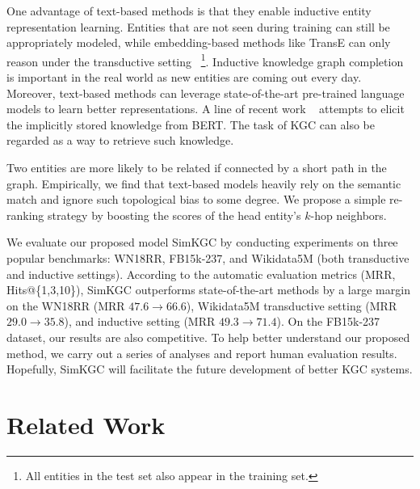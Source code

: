 \documentclass[11pt]{article}
\begin{document}
One advantage of text-based methods is that
they enable inductive entity representation learning.
Entities that are not seen during training can still be appropriately modeled,
while embedding-based methods like TransE can only reason under the transductive setting
~\footnote{All entities in the test set also appear in the training set.}.
Inductive knowledge graph completion is important in the real world
as new entities are coming out every day.
Moreover,
text-based methods can leverage state-of-the-art pre-trained language models to learn better representations.
A line of recent work ~\citep{shin-etal-2020-autoprompt,petroni-etal-2019-language}
attempts to elicit the implicitly stored knowledge from BERT.
The task of KGC can also be regarded as a way to retrieve such knowledge.

Two entities are more likely to be related
if connected by a short path in the graph.
Empirically,
we find that text-based models heavily rely on the semantic match
and ignore such topological bias to some degree.
We propose a simple re-ranking strategy
by boosting the scores of the head entity's $k$-hop neighbors.

We evaluate our proposed model SimKGC
by conducting experiments on three popular benchmarks:
WN18RR, FB15k-237, and Wikidata5M (both transductive and inductive settings).
According to the automatic evaluation metrics (MRR, Hits@\{1,3,10\}),
SimKGC outperforms state-of-the-art methods by a large margin
on the WN18RR (MRR $47.6 \rightarrow 66.6$),
Wikidata5M transductive setting (MRR $29.0 \rightarrow 35.8$),
and inductive setting (MRR $49.3 \rightarrow 71.4$).
On the FB15k-237 dataset,
our results are also competitive.
To help better understand our proposed method,
we carry out a series of analyses
and report human evaluation results.
Hopefully,
SimKGC will facilitate the future development of better KGC systems.

\section{Related Work}
\end{document}
